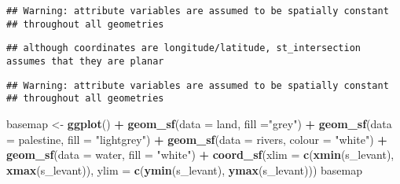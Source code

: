\documentclass[]{article}
\newenvironment{Shaded}{\begin{snugshade}}{\end{snugshade}}
\newcommand{\DataTypeTok}[1]{\textcolor[rgb]{0.13,0.29,0.53}{#1}}
\newcommand{\KeywordTok}[1]{\textcolor[rgb]{0.13,0.29,0.53}{\textbf{#1}}}
\newcommand{\NormalTok}[1]{#1}
\newcommand{\OperatorTok}[1]{\textcolor[rgb]{0.81,0.36,0.00}{\textbf{#1}}}
\newcommand{\StringTok}[1]{\textcolor[rgb]{0.31,0.60,0.02}{#1}}
\begin{document}
\begin{verbatim}
## Warning: attribute variables are assumed to be spatially constant
## throughout all geometries
\end{verbatim}

\begin{Shaded}
\end{Shaded}

\begin{verbatim}
## although coordinates are longitude/latitude, st_intersection assumes that they are planar
\end{verbatim}

\begin{verbatim}
## Warning: attribute variables are assumed to be spatially constant
## throughout all geometries
\end{verbatim}

\begin{Shaded}
\begin{Highlighting}[]
\NormalTok{basemap <-}\StringTok{ }\KeywordTok{ggplot}\NormalTok{() }\OperatorTok{+}\StringTok{ }
\StringTok{  }\KeywordTok{geom_sf}\NormalTok{(}\DataTypeTok{data =}\NormalTok{ land, }\DataTypeTok{fill =}\StringTok{"grey"}\NormalTok{) }\OperatorTok{+}
\StringTok{  }\KeywordTok{geom_sf}\NormalTok{(}\DataTypeTok{data =}\NormalTok{ palestine, }\DataTypeTok{fill =} \StringTok{"lightgrey"}\NormalTok{) }\OperatorTok{+}\StringTok{ }
\StringTok{  }\KeywordTok{geom_sf}\NormalTok{(}\DataTypeTok{data =}\NormalTok{ rivers, }\DataTypeTok{colour =} \StringTok{"white"}\NormalTok{) }\OperatorTok{+}
\StringTok{  }\KeywordTok{geom_sf}\NormalTok{(}\DataTypeTok{data =}\NormalTok{ water, }\DataTypeTok{fill =} \StringTok{"white"}\NormalTok{) }\OperatorTok{+}
\StringTok{  }\KeywordTok{coord_sf}\NormalTok{(}\DataTypeTok{xlim =} \KeywordTok{c}\NormalTok{(}\KeywordTok{xmin}\NormalTok{(s_levant), }\KeywordTok{xmax}\NormalTok{(s_levant)),}
           \DataTypeTok{ylim =} \KeywordTok{c}\NormalTok{(}\KeywordTok{ymin}\NormalTok{(s_levant), }\KeywordTok{ymax}\NormalTok{(s_levant)))}
\NormalTok{basemap}
\end{Highlighting}
\end{Shaded}
\end{document}
